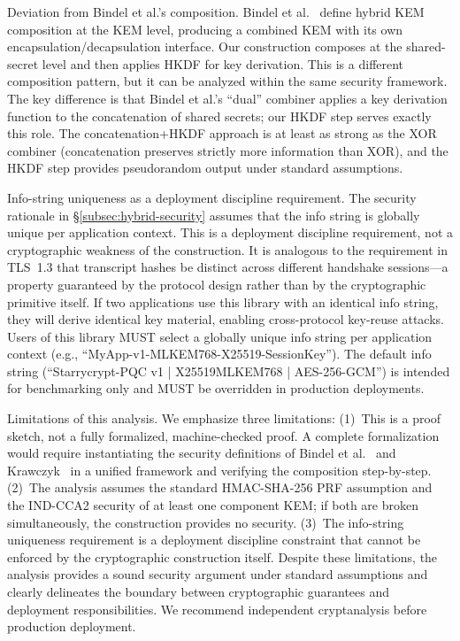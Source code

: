 \documentclass[11pt,a4paper]{article}
\def\textbf#1{#1}%
\def\texttt#1{#1}%
\def\emph#1{#1}%
\begin{document}
\textbf{Deviation from Bindel et al.'s composition.}
Bindel et al.~\cite{bindel2019hybrid} define hybrid KEM composition at the KEM level, producing a combined KEM with its own encapsulation/decapsulation interface. Our construction composes at the shared-secret level and then applies HKDF for key derivation. This is a different composition pattern, but it can be analyzed within the same security framework. The key difference is that Bindel et al.'s ``dual'' combiner applies a key derivation function to the concatenation of shared secrets; our HKDF step serves exactly this role. The concatenation+HKDF approach is at least as strong as the XOR combiner (concatenation preserves strictly more information than XOR), and the HKDF step provides pseudorandom output under standard assumptions.

\textbf{Info-string uniqueness as a deployment discipline requirement.}
The security rationale in \S\ref{subsec:hybrid-security} assumes that the info string is globally unique per application context. This is a \emph{deployment discipline requirement}, not a cryptographic weakness of the construction. It is analogous to the requirement in TLS~1.3 that transcript hashes be distinct across different handshake sessions---a property guaranteed by the protocol design rather than by the cryptographic primitive itself. \textbf{If two applications use this library with an identical info string, they will derive identical key material, enabling cross-protocol key-reuse attacks.} Users of this library MUST select a globally unique info string per application context (e.g., \texttt{``MyApp-v1-MLKEM768-X25519-SessionKey''}). The default info string (\texttt{``Starrycrypt-PQC v1 | X25519MLKEM768 | AES-256-GCM''}) is intended for benchmarking only and MUST be overridden in production deployments.

\textbf{Limitations of this analysis.}
We emphasize three limitations: (1)~This is a proof sketch, not a fully formalized, machine-checked proof. A complete formalization would require instantiating the security definitions of Bindel et al.~\cite{bindel2019hybrid} and Krawczyk~\cite{krawczyk2010hkdf} in a unified framework and verifying the composition step-by-step. (2)~The analysis assumes the standard HMAC-SHA-256 PRF assumption and the IND-CCA2 security of at least one component KEM; if both are broken simultaneously, the construction provides no security. (3)~The info-string uniqueness requirement is a deployment discipline constraint that cannot be enforced by the cryptographic construction itself. Despite these limitations, the analysis provides a sound security argument under standard assumptions and clearly delineates the boundary between cryptographic guarantees and deployment responsibilities. We recommend independent cryptanalysis before production deployment.
\end{document}

